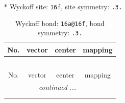\documentclass[fleqn,8pt]{jsarticle}
\begin{document}
* Wyckoff site: {\tt 16f}, site symmetry: {\tt .3.}
\renewcommand{\arraystretch}{1.2}
\begin{longtable}{cccc}
\caption{Wyckoff bond: {\tt 16a@16f}, bond symmetry: {\tt .3.}}
 \\
 \hline \hline
No. & vector & center & mapping \\ \hline \endfirsthead

\multicolumn{3}{l}{\tablename\ \thetable{}} \\
 \hline \hline
No. & vector & center & mapping \\ \hline \endhead

 \hline \hline
\multicolumn{3}{r}{\footnotesize\it continued ...} \\ \endfoot

 \hline \hline
\multicolumn{3}{r}{} \\ \endlastfoot


\end{longtable}
\end{document}
